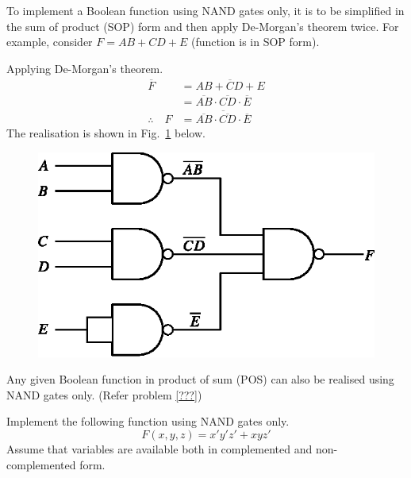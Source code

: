 \eject


To implement a Boolean function using NAND gates only, it is to be simplified in the sum of product (SOP) form and then apply De-Morgan's theorem twice. For example, consider $F=AB+CD+E$ (function is in SOP form).

Applying De-Morgan's theorem.
\begin{align*}
\overline{F} &= \overline{AB+CD+E}\\[3pt]
&= \overline{AB}\cdot \overline{CD}\cdot \overline{E}\\[3pt]
\therefore\quad F &= \overline{\overline{AB}\cdot \overline{CD}\cdot \overline{E}}
\end{align*}
The realisation is shown in Fig.~\ref{fig5.22} below.
\begin{figure}[H]
\centering
\includegraphics{chap5/fig7.eps}
\caption{}\label{fig5.22}
\end{figure}

Any given Boolean function in product of sum (POS) can also be realised using NAND gates only. (Refer problem \ref{???})

\begin{problem}\label{prob5.78}
Implement the following function using NAND gates only.
$$
F(x,y,z)=x'y'z'+xyz'
$$
Assume that variables are available both in complemented and non-complemented form.
\end{problem}

